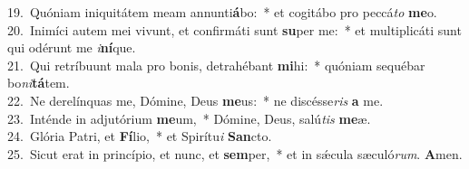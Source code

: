 {19.~}Quóniam iniquitátem meam annunti\textbf{á}bo:~* et cogitábo pro peccá\textit{to} \textbf{me}o.\\
{20.~}Inimíci autem mei vivunt, et confirmáti sunt \textbf{su}per me:~* et multiplicáti sunt qui odérunt me \textit{i}\textbf{ní}que.\\
{21.~}Qui retríbuunt mala pro bonis, detrahébant \textbf{mi}hi:~* quóniam sequébar bo\textit{ni}\textbf{tá}tem.\\
{22.~}Ne derelínquas me, Dómine, Deus \textbf{me}us:~* ne discésse\textit{ris} \textbf{a} me.\\
{23.~}Inténde in adjutórium \textbf{me}um,~* Dómine, Deus, salú\textit{tis} \textbf{me}æ.\\
{24.~}Glória Patri, et \textbf{Fí}lio,~* et Spirítu\textit{i} \textbf{San}cto.\\
{25.~}Sicut erat in princípio, et nunc, et \textbf{sem}per,~* et in sǽcula sæculó\textit{rum}. \textbf{A}men.\\
